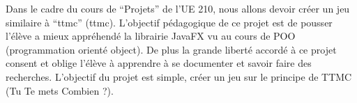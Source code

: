 Dans le cadre du cours de ``Projets'' de l'UE 210, nous allons devoir créer un jeu similaire à ``\acrlong{ttmc}'' (\acrshort{ttmc}). L'objectif pédagogique de ce projet est de pousser l'élève a mieux appréhendé la librairie JavaFX vu au cours de 
POO (programmation orienté object). De plus la grande liberté accordé à ce projet consent et oblige l'élève à apprendre à se documenter et savoir faire des recherches.  L'objectif du projet est simple, créer un jeu sur le principe de TTMC (Tu Te 
mets Combien ?).  
